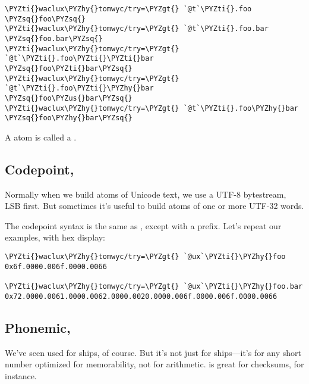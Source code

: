 \begin{framed_shaded}
\begin{Verbatim}[fontsize=\relsize{-2.5},fontseries=b,commandchars=\\\{\}]
\PYZti{}waclux\PYZhy{}tomwyc/try=\PYZgt{} `@t`\PYZti{}.foo
\PYZsq{}foo\PYZsq{}
\PYZti{}waclux\PYZhy{}tomwyc/try=\PYZgt{} `@t`\PYZti{}.foo.bar
\PYZsq{}foo.bar\PYZsq{}
\PYZti{}waclux\PYZhy{}tomwyc/try=\PYZgt{} `@t`\PYZti{}.foo\PYZti{}\PYZti{}bar
\PYZsq{}foo\PYZti{}bar\PYZsq{}
\PYZti{}waclux\PYZhy{}tomwyc/try=\PYZgt{} `@t`\PYZti{}.foo\PYZti{}\PYZhy{}bar
\PYZsq{}foo\PYZus{}bar\PYZsq{}
\PYZti{}waclux\PYZhy{}tomwyc/try=\PYZgt{} `@t`\PYZti{}.foo\PYZhy{}bar
\PYZsq{}foo\PYZhy{}bar\PYZsq{}
\end{Verbatim}
\end{framed_shaded}

A  atom is called a .

\subsection{Codepoint, }

Normally when we build atoms of Unicode text, we use a UTF-8
bytestream, LSB first.  But sometimes it's useful to build atoms
of one or more UTF-32 words.

The codepoint syntax is the same as , except with a \kode{\sig-}
prefix.  Let's repeat our examples, with hex display:

\begin{framed_shaded}
\begin{Verbatim}[fontsize=\relsize{-2.5},fontseries=b,commandchars=\\\{\}]
\PYZti{}waclux\PYZhy{}tomwyc/try=\PYZgt{} `@ux`\PYZti{}\PYZhy{}foo
0x6f.0000.006f.0000.0066

\PYZti{}waclux\PYZhy{}tomwyc/try=\PYZgt{} `@ux`\PYZti{}\PYZhy{}foo.bar
0x72.0000.0061.0000.0062.0000.0020.0000.006f.0000.006f.0000.0066
\end{Verbatim}
\end{framed_shaded}

\subsection{Phonemic, }

We've seen  used for ships, of course.  But it's not just for
ships---it's for any short number optimized for memorability, not
for arithmetic.   is great for checksums, for instance.

